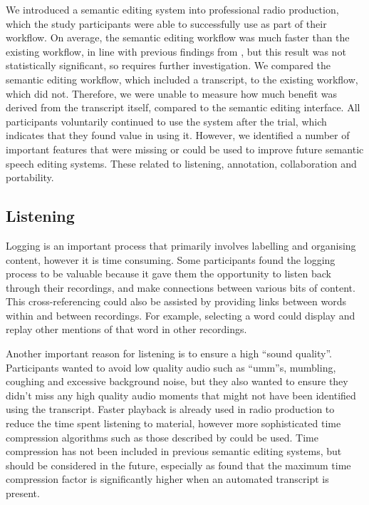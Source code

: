 We introduced a semantic editing system into professional radio production, which the study participants were able to
successfully use as part of their workflow. On average, the semantic editing workflow was much faster than the existing
workflow, in line with previous findings from \citet{Whittaker2004}, but this result was not statistically significant,
so requires further investigation.  We compared the semantic editing workflow, which included a transcript, to the
existing workflow, which did not. Therefore, we were unable to measure how much benefit was derived from the transcript
itself, compared to the semantic editing interface.  All participants voluntarily continued to use the system after the
trial, which indicates that they found value in using it. However, we identified a number of important features that
were missing or could be used to improve future semantic speech editing systems. These related to listening,
annotation, collaboration and portability.

\subsection{Listening}

Logging is an important process that primarily involves labelling and organising content, however it is time consuming.
Some participants found the logging process to be valuable
because it gave them the opportunity to listen back through their recordings, and make connections between various bits
of content. This cross-referencing could also be assisted by providing links between words within and between
recordings. For example, selecting a word could display and replay other mentions of that word in other recordings.

Another important reason for listening is to ensure a high ``sound quality''. Participants wanted to avoid low quality
audio such as ``umm''s, mumbling, coughing and excessive background noise, but they also wanted to ensure they didn't
miss any high quality audio moments that might not have been identified using the transcript.  Faster playback is
already used in radio production to reduce the time spent listening to material, however more sophisticated time
compression algorithms such as those described by \citet{Arons1997} could be used. Time compression has not been
included in previous semantic editing systems, but should be considered in the future, especially as \citet{Vemuri2004}
found that the maximum time compression factor is significantly higher when an automated transcript is present.

